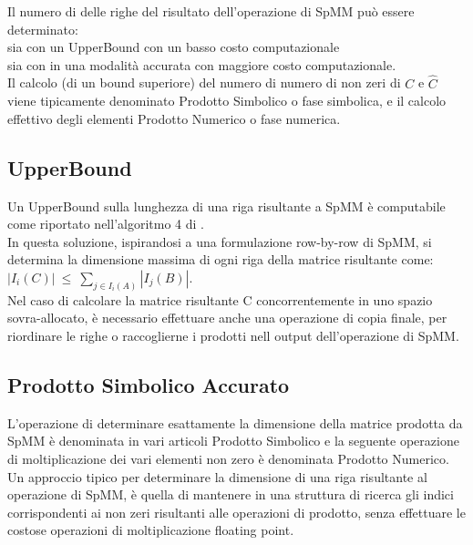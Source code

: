 Il numero di \nnz delle righe del risultato dell'operazione di SpMM può essere determinato:\\ %
sia con un UpperBound con un basso costo computazionale \\ %
sia con in una modalità accurata con maggiore costo computazionale.\\ %

\label{ChExistingTecqs:spMM_symb_num_naming}
Il calcolo (di un bound superiore) del numero di numero di non zeri di $C$ e $\hat{C}$ viene tipicamente 
denominato Prodotto Simbolico o fase simbolica, e il calcolo effettivo degli elementi \nnz Prodotto Numerico o fase numerica.\\

\subsection{UpperBound}	\label{ChExistingTecqs:symbUpperBound}
Un UpperBound sulla lunghezza di una riga risultante a SpMM è computabile come riportato nell'algoritmo 4 di .\\
In questa soluzione, ispirandosi a una formulazione row-by-row di SpMM, 
si determina la dimensione massima di ogni riga della matrice risultante come:\\
$ | I_i(C) |~\leq~\sum\limits_{ j \in I_i(A) }  | I_j(B) | $.\\
\voidLine
Nel caso di calcolare la matrice risultante C concorrentemente in uno spazio sovra-allocato, è necessario effettuare anche una operazione di copia finale,
per riordinare le righe o raccoglierne i \nnz prodotti nell output dell'operazione di SpMM.\\

\subsection{Prodotto Simbolico Accurato}
L'operazione di determinare esattamente la dimensione della matrice prodotta da SpMM
è denominata in vari articoli Prodotto Simbolico e 
la seguente operazione di moltiplicazione dei vari elementi non zero è denominata Prodotto Numerico.\\

Un approccio tipico per determinare la dimensione di una riga risultante al operazione di SpMM, 
è quella di mantenere in una struttura di ricerca gli indici corrispondenti 
ai non zeri risultanti alle operazioni di prodotto, senza effettuare le costose 
operazioni di moltiplicazione floating point.\\

